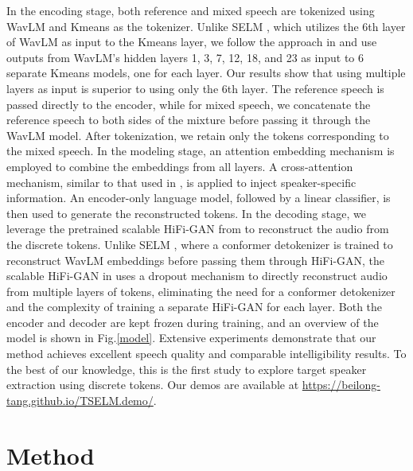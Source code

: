 \documentclass[conference]{IEEEtran}
\begin{document}
In the encoding stage, both reference and mixed speech are tokenized using WavLM and Kmeans as the tokenizer. Unlike SELM \cite{selm}, which utilizes the 6th layer of WavLM as input to the Kmeans layer, we follow the approach in \cite{dasb} and use outputs from WavLM's hidden layers 1, 3, 7, 12, 18, and 23 as input to 6 separate Kmeans models, one for each layer. Our results show that using multiple layers as input is superior to using only the 6th layer. The reference speech is passed directly to the encoder, while for mixed speech, we concatenate the reference speech to both sides of the mixture before passing it through the WavLM model. After tokenization, we retain only the tokens corresponding to the mixed speech.
In the modeling stage, an attention embedding mechanism is employed to combine the embeddings from all layers. A cross-attention mechanism, similar to that used in \cite{usef_tes}, is applied to inject speaker-specific information. An encoder-only language model, followed by a linear classifier, is then used to generate the reconstructed tokens.
In the decoding stage, we leverage the pretrained scalable HiFi-GAN from \cite{unit_hifi} to reconstruct the audio from the discrete tokens. Unlike SELM \cite{selm}, where a conformer detokenizer is trained to reconstruct WavLM embeddings before passing them through HiFi-GAN, the scalable HiFi-GAN in \cite{unit_hifi} uses a dropout mechanism to directly reconstruct audio from multiple layers of tokens, eliminating the need for a conformer detokenizer and the complexity of training a separate HiFi-GAN for each layer. Both the encoder and decoder are kept frozen during training, and an overview of the model is shown in Fig.\ref{model}.
Extensive experiments demonstrate that our method achieves excellent speech quality and comparable intelligibility results. To the best of our knowledge, this is the first study to explore target speaker extraction using discrete tokens. Our demos are available at \href{https://beilong-tang.github.io/TSELM.demo/}{https://beilong-tang.github.io/TSELM.demo/}.



\section{Method}
\end{document}
